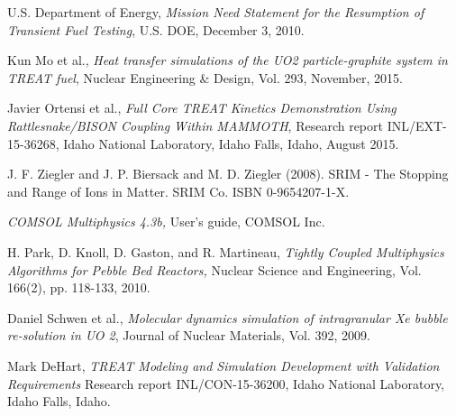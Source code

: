 \documentclass{anstrans}
\begin{document}
\begin{thebibliography}{1}

 U.S. Department of Energy, {\em Mission Need Statement for the Resumption of Transient Fuel Testing}, U.S. DOE, December 3, 2010.

 Kun Mo et al., {\em Heat transfer simulations of the UO2 particle-graphite system in TREAT fuel}, Nuclear Engineering \& Design, Vol. 293, November, 2015.

 Javier Ortensi et al.,  {\em Full Core TREAT Kinetics Demonstration Using Rattlesnake/BISON Coupling Within MAMMOTH}, Research report INL/EXT-15-36268, Idaho National Laboratory, Idaho Falls, Idaho, August 2015.


 J. F. Ziegler and J. P. Biersack and M. D. Ziegler (2008). SRIM - The Stopping and Range of Ions in Matter. SRIM Co. ISBN 0-9654207-1-X.

 {\em COMSOL Multiphysics 4.3b,} User's guide, COMSOL Inc.

 H. Park, D. Knoll, D. Gaston, and R. Martineau, {\em Tightly Coupled Multiphysics Algorithms for Pebble Bed Reactors,} Nuclear Science and Engineering, Vol. 166(2), pp. 118-133, 2010.

 Daniel Schwen et al., {\em Molecular dynamics simulation of intragranular Xe bubble re-solution in UO 2}, Journal of Nuclear Materials, Vol. 392, 2009.

 Mark DeHart, {\em TREAT Modeling and Simulation Development with Validation Requirements} Research report INL/CON-15-36200, Idaho National Laboratory, Idaho Falls, Idaho.

%


\end{thebibliography}
\end{document}
